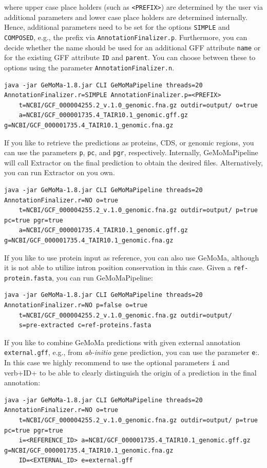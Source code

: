 \documentclass{article}
\begin{document}
where upper case place holders (such as \verb+<PREFIX>+) are determined by the user via additional parameters and lower case place holders are determined internally. Hence, additional parameters need to be set for the options \verb+SIMPLE+ and \verb+COMPOSED+, e.g., the prefix via \verb+AnnotationFinalizer.p+. Furthermore, you can decide whether the name should be used for an additional GFF attribute \verb+name+ or for the existing GFF attribute \verb+ID+ and \verb+parent+. You can choose between these to options using the parameter \verb+AnnotationFinalizer.n+. 
\begin{Verbatim}
java -jar GeMoMa-1.8.jar CLI GeMoMaPipeline threads=20 AnnotationFinalizer.r=SIMPLE AnnotationFinalizer.p=<PREFIX>
	t=NCBI/GCF_000004255.2_v.1.0_genomic.fna.gz outdir=output/ o=true
	a=NCBI/GCF_000001735.4_TAIR10.1_genomic.gff.gz g=NCBI/GCF_000001735.4_TAIR10.1_genomic.fna.gz 
\end{Verbatim}
If you like to retrieve the predictions as proteins, CDS, or genomic regions, you can use the parameters \verb+p+, \verb+pc+, and \verb+pgr+, respectively. Internally, GeMoMaPipeline will call Extractor on the final prediction to obtain the desired files. Alternatively, you can run Extractor on you own. 
\begin{Verbatim}
java -jar GeMoMa-1.8.jar CLI GeMoMaPipeline threads=20 AnnotationFinalizer.r=NO o=true 
	t=NCBI/GCF_000004255.2_v.1.0_genomic.fna.gz outdir=output/ p=true pc=true pgr=true
	a=NCBI/GCF_000001735.4_TAIR10.1_genomic.gff.gz g=NCBI/GCF_000001735.4_TAIR10.1_genomic.fna.gz 
\end{Verbatim}
If you like to use protein input as reference, you can also use GeMoMa, although it is not able to utilize intron position conservation in this case. Given a \verb+ref-protein.fasta+, you can run GeMoMaPipeline:
\begin{Verbatim}
java -jar GeMoMa-1.8.jar CLI GeMoMaPipeline threads=20 AnnotationFinalizer.r=NO p=false o=true 
	t=NCBI/GCF_000004255.2_v.1.0_genomic.fna.gz outdir=output/
	s=pre-extracted c=ref-proteins.fasta
\end{Verbatim}
If you like to combine GeMoMa predictions with given external annotation \verb+external.gff+, e.g., from \emph{ab-initio} gene prediction, you can use the parameter \verb+e+:. In this case we highly recommend to use the optional parameters \verb+i+ and verb+ID+ to be able to clearly distinguish the origin of a prediction in the final annotation:
\begin{Verbatim}
java -jar GeMoMa-1.8.jar CLI GeMoMaPipeline threads=20 AnnotationFinalizer.r=NO o=true 
	t=NCBI/GCF_000004255.2_v.1.0_genomic.fna.gz outdir=output/ p=true pc=true pgr=true
	i=<REFERENCE_ID> a=NCBI/GCF_000001735.4_TAIR10.1_genomic.gff.gz g=NCBI/GCF_000001735.4_TAIR10.1_genomic.fna.gz 
	ID=<EXTERNAL_ID> e=external.gff
\end{Verbatim}
\clearpage
\end{document}
